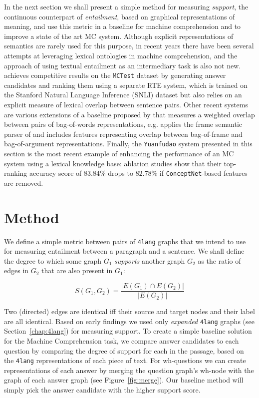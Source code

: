 In the next section we shall present a simple method for measuring
\textit{support}, the continuous counterpart of \textit{entailment},
based on graphical representations of meaning, and use this metric in a
baseline for machine comprehension and to improve a state of the art
MC system.
Although explicit representations of semantics are rarely used for this purpose,
in recent years there have been several attempts at leveraging lexical
ontologies in machine comprehension, and the approach of using textual
entailment as an intermediary task is also not new. \cite{Wang:2016}
achieves competitive results on the \texttt{MCTest} dataset
\cite{Richardson:2013} by generating
answer candidates and ranking them using a separate RTE system, which is
trained on the Stanford Natural Language Inference (SNLI) dataset
\cite{Bowman:2015}
but also relies on an explicit measure of lexical overlap between sentence
pairs. Other recent systems are various extensions of a baseline
proposed by \cite{Richardson:2013} that measures a weighted overlap
between pairs of bag-of-words representations, e.g. \cite{Wang:2015b}
applies the frame
semantic parser of \cite{Das:2010} and includes features representing
overlap between bag-of-frame and bag-of-argument representations.
Finally, the \texttt{Yuanfudao} system presented in this section is the most
recent example of enhancing the performance of an MC system using a lexical
knowledge base: ablation studies show that their top-ranking accuracy score of
$83.84\%$ drops to $82.78\%$ if \texttt{ConceptNet}-based features are removed.

\section{Method}
\label{sec:method}

We define a simple metric between pairs of \texttt{4lang} graphs that
we intend to use for measuring entailment between a paragraph and a
sentence. We shall define the degree to which some graph $G_1$
\textit{supports} another graph $G_2$ as the ratio of edges in $G_2$
that are also present in $G_1$:

\[ S(G_1, G_2) =\frac{|E(G_1)\cap E(G_2)|}{|E(G_2)|}\]

Two (directed) edges are identical iff their source
and target nodes and their label are all identical. Based on early
findings we used only \textit{expanded} \texttt{4lang} graphs (see
Section~\ref{chap:4lang}) for measuring support. 
To create a simple baseline solution for the Machine Comprehension task,
we compare answer candidates to each question by comparing the degree of
support for each in the passage, based on the \texttt{4lang} representations of
each piece of text. For wh-questions we can create representations of
each answer by merging the question graph's wh-node with the graph of
each answer graph (see Figure~\ref{fig:merge}). Our baseline method will simply
pick the answer candidate with the higher support score.


